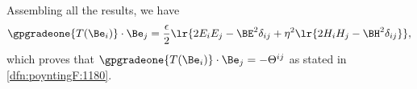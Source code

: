 Assembling all the results, we have
\begin{dmath}\label{eqn:stressTensorAlgebraically:1160}
\gpgradeone{T(\Be_i)} \cdot \Be_j
=
\frac{\epsilon}{2}
\lr{
   2 E_i E_j - \BE^2 \delta_{ij}
   + \eta^2 \lr{ 2 H_i H_j - \BH^2 \delta_{ij} }
},
\end{dmath}
which proves that \( \gpgradeone{T(\Be_i)} \cdot \Be_j = -\Theta^{ij} \) as stated in
\cref{dfn:poyntingF:1180}.
